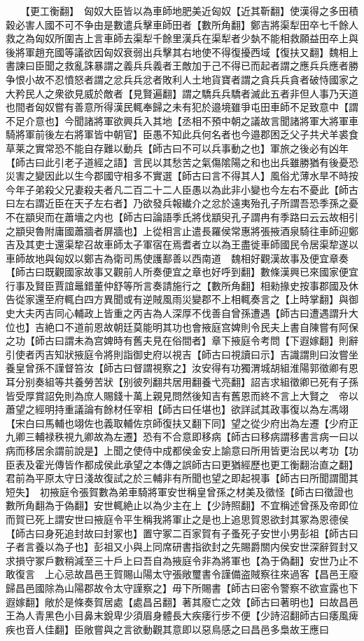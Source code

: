　　【更工衡翻】　匈奴大臣皆以為車師地肥美近匈奴【近其靳翻】使漢得之多田積穀必害人國不可不争由是數遣兵擊車師田者【數所角翻】鄭吉將渠犁田卒七千餘人救之為匈奴所圍吉上言車師去渠犁千餘里漢兵在渠犁者少埶不能相救願益田卒上與後將軍趙充國等議欲因匈奴衰弱出兵擊其右地使不得復擾西域【復扶又翻】魏相上書諫曰臣聞之救亂誅暴謂之義兵兵義者王敵加于己不得已而起者謂之應兵兵應者勝争恨小故不忍憤怒者謂之忿兵兵忿者敗利人土地貨寶者謂之貪兵兵貪者破恃國家之大矜民人之衆欲見威於敵者【見賢遍翻】謂之驕兵兵驕者滅此五者非但人事乃天道也間者匈奴嘗有善意所得漢民輒奉歸之未有犯於邉境雖爭屯田車師不足致意中【謂不足介意也】今聞諸將軍欲興兵入其地【丞相不預中朝之議故言聞諸將軍大將軍車騎將軍前後左右將軍皆中朝官】臣愚不知此兵何名者也今邉郡困乏父子共犬羊裘食草莱之實常恐不能自存難以動兵【師古曰不可以兵事動之也】軍旅之後必有凶年【師古曰此引老子道經之語】言民以其愁苦之氣傷隂陽之和也出兵雖勝猶有後憂恐災害之變因此以生今郡國守相多不實選【師古曰言不得其人】風俗尤薄水旱不時按今年子弟殺父兄妻殺夫者凡二百二十二人臣愚以為此非小變也今左右不憂此【師古曰左右謂近臣在天子左右者】乃欲發兵報纎介之忿於遠夷殆孔子所謂吾恐季孫之憂不在顓臾而在蕭墻之内也【師古曰論語季氏將伐顓臾孔子謂冉有季路曰云云故相引之顓臾魯附庸國蕭牆者屏牆也】上從相言止遣長羅侯常惠將張掖酒泉騎往車師迎鄭吉及其吏士還渠犂召故車師太子軍宿在焉耆者立以為王盡徙車師國民令居渠犂遂以車師故地與匈奴以鄭吉為衛司馬使護鄯善以西南道　魏相好觀漢故事及便宜章奏【師古曰既觀國家故事又觀前人所奏便宜之章也好呼到翻】數條漢興已來國家便宜行事及賢臣賈誼鼂錯董仲舒等所言奏請施行之【數所角翻】相勑掾史按事郡國及休告從家還至府輒白四方異聞或有逆賊風雨災變郡不上相輒奏言之【上時掌翻】與御史大夫丙吉同心輔政上皆重之丙吉為人深厚不伐善自曾孫遭遇【師古曰遭遇謂升大位也】吉絶口不道前恩故朝廷莫能明其功也會掖庭宫婢則令民夫上書自陳嘗有阿保之功【師古曰謂未為宫婢時有舊夫見在俗間者】章下掖庭令考問【下遐嫁翻】則辭引使者丙吉知狀掖庭令將則詣御史府以視吉【師古曰視讀曰示】吉識謂則曰汝嘗坐養皇曾孫不謹督笞汝【師古曰督謂視察之】汝安得有功獨渭城胡組淮陽郭徵卿有恩耳分别奏組等共養勞苦狀【别彼列翻共居用翻養弋亮翻】詔吉求組徵卿已死有子孫皆受厚賞詔免則為庶人賜錢十萬上親見問然後知吉有舊恩而終不言上大賢之　帝以蕭望之經明持重議論有餘材任宰相【師古曰任堪也】欲詳試其政事復以為左馮翊【宋白曰馬輔也翊佐也義取輔佐京師復扶又翻下同】望之從少府出為左遷【少府正九卿三輔禄秩視九卿故為左遷】恐有不合意即移病【師古曰移病謂移書言病一曰以病而移居余謂前說是】上聞之使侍中成都侯金安上諭意曰所用皆更治民以考功【功臣表及霍光傳皆作都成侯此承望之本傳之誤師古曰更猶經歷也更工衡翻治直之翻】君前為平原太守日淺故復試之於三輔非有所聞也望之即起視事【師古曰所聞謂聞其短失】　初掖庭令張賀數為弟車騎將軍安世稱皇曾孫之材美及徵怪【師古曰徵證也數所角翻為于偽翻】安世輒絶止以為少主在上【少詩照翻】不宜稱述曾孫及帝即位而賀已死上謂安世曰掖庭令平生稱我將軍止之是也上追思賀恩欲封其冢為恩德侯【師古曰身死追封故曰封冢也】置守冢二百家賀有子蚤死子安世小男彭祖【師古曰子者言養以為子也】彭祖又小與上同席研書指欲封之先賜爵關内侯安世深辭賀封又求損守冢戶數稍減至三十戶上曰吾自為掖庭令非為將軍也【為于偽翻】安世乃止不敢復言　上心忌故昌邑王賀賜山陽太守張敞璽書令謹備盗賊察往來過客【昌邑王廢歸昌邑國除為山陽郡故令太守謹察之】毋下所賜書【師古曰密令警察不欲宣露也下遐嫁翻】敞於是條奏賀居處【處昌呂翻】著其廢亡之效【師古曰著明也】曰故昌邑王為人青黑色小目鼻末銳卑少須眉身體長大疾痿行步不便【少詩沼翻師古曰痿風痺疾也音人佳翻】臣敞嘗與之言欲動觀其意即以惡鳥感之曰昌邑多梟故王應曰